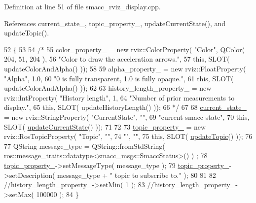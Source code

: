 Definition at line 51 of file smacc\+\_\+rviz\+\_\+display.\+cpp.



References current\+\_\+state\+\_\+, topic\+\_\+property\+\_\+, update\+Current\+State(), and update\+Topic().


\begin{DoxyCode}
52 \{
53 
54   \textcolor{comment}{/*}
55 \textcolor{comment}{  color\_property\_ = new rviz::ColorProperty( "Color", QColor( 204, 51, 204 ),}
56 \textcolor{comment}{                                             "Color to draw the acceleration arrows.",}
57 \textcolor{comment}{                                             this, SLOT( updateColorAndAlpha() ));}
58 \textcolor{comment}{}
59 \textcolor{comment}{  alpha\_property\_ = new rviz::FloatProperty( "Alpha", 1.0,}
60 \textcolor{comment}{                                             "0 is fully transparent, 1.0 is fully opaque.",}
61 \textcolor{comment}{                                             this, SLOT( updateColorAndAlpha() ));}
62 \textcolor{comment}{}
63 \textcolor{comment}{  history\_length\_property\_ = new rviz::IntProperty( "History length", 1,}
64 \textcolor{comment}{                                                    "Number of prior measurements to display.",}
65 \textcolor{comment}{                                                    this, SLOT( updateHistoryLength() ));}
66 \textcolor{comment}{                                                    */}
67 
68   \hyperlink{classsmacc__rviz__plugin_1_1SmaccRvizDisplay_a342ff238c1dfaa427f09ee205a9e92d5}{current\_state\_} = \textcolor{keyword}{new} rviz::StringProperty( \textcolor{stringliteral}{"CurrentState"}, \textcolor{stringliteral}{""},
69                                                     \textcolor{stringliteral}{"current smacc state"},
70                                                     \textcolor{keyword}{this}, SLOT( 
      \hyperlink{classsmacc__rviz__plugin_1_1SmaccRvizDisplay_a6031090e46077a5e95754b5f70ea639a}{updateCurrentState}() ));
71 
72   
73   \hyperlink{classsmacc__rviz__plugin_1_1SmaccRvizDisplay_ad81e5239e1343b2ba01ee16d1f010932}{topic\_property\_} = \textcolor{keyword}{new} rviz::RosTopicProperty( \textcolor{stringliteral}{"Topic"}, \textcolor{stringliteral}{""},
74                                             \textcolor{stringliteral}{""}, \textcolor{stringliteral}{""},
75                                             \textcolor{keyword}{this}, SLOT( \hyperlink{classsmacc__rviz__plugin_1_1SmaccRvizDisplay_adf332ae95bd83969b33ba713a60832fd}{updateTopic}() ));
76 
77   QString message\_type = QString::fromStdString( ros::message\_traits::datatype<smacc\_msgs::SmaccStatus>() )
      ;
78       \hyperlink{classsmacc__rviz__plugin_1_1SmaccRvizDisplay_ad81e5239e1343b2ba01ee16d1f010932}{topic\_property\_}->setMessageType( message\_type );
79       \hyperlink{classsmacc__rviz__plugin_1_1SmaccRvizDisplay_ad81e5239e1343b2ba01ee16d1f010932}{topic\_property\_}->setDescription( message\_type + \textcolor{stringliteral}{" topic to subscribe to."} );
80 
81 
82   \textcolor{comment}{//history\_length\_property\_->setMin( 1 );}
83   \textcolor{comment}{//history\_length\_property\_->setMax( 100000 );}
84 \}
\end{DoxyCode}
